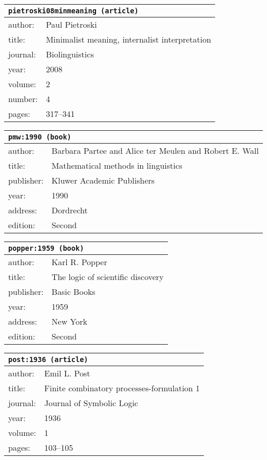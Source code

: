 \documentclass{article}
\begin{document}
\bigskip

\begin{tabular}{p{}p{}}
\multicolumn{2}{l}{\texttt{pietroski08minmeaning (article)}}\\
\hline
author: & Paul Pietroski\\
title: & Minimalist meaning, internalist interpretation\\
journal: & Biolinguistics\\
year: & 2008\\
volume: & 2\\
number: & 4\\
pages: & 317--341\\
\end{tabular}

\bigskip

\begin{tabular}{p{}p{}}
\multicolumn{2}{l}{\texttt{pmw:1990 (book)}}\\
\hline
author: & Barbara Partee and Alice {ter Meulen} and Robert E. Wall\\
title: & Mathematical methods in linguistics\\
publisher: & Kluwer Academic Publishers\\
year: & 1990\\
address: & Dordrecht\\
edition: & Second\\
\end{tabular}

\bigskip

\begin{tabular}{p{}p{}}
\multicolumn{2}{l}{\texttt{popper:1959 (book)}}\\
\hline
author: & Karl R. Popper\\
title: & The logic of scientific discovery\\
publisher: & Basic Books\\
year: & 1959\\
address: & New York\\
edition: & Second\\
\end{tabular}

\bigskip

\begin{tabular}{p{}p{}}
\multicolumn{2}{l}{\texttt{post:1936 (article)}}\\
\hline
author: & Emil L. Post\\
title: & Finite combinatory processes-formulation 1\\
journal: & Journal of Symbolic Logic\\
year: & 1936\\
volume: & 1\\
pages: & 103--105\\
\end{tabular}
\end{document}
